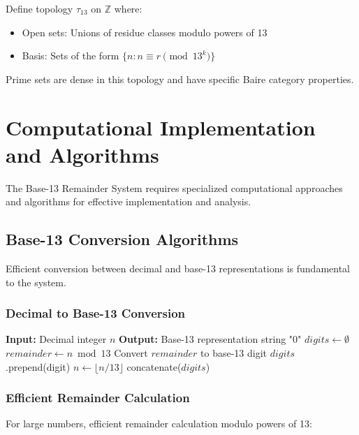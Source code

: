 \documentclass[12pt,a4paper]{report}
\begin{document}
Define topology $\tau_{13}$ on $\mathbb{Z}$ where:
\begin{itemize}
\item Open sets: Unions of residue classes modulo powers of 13
\item Basis: Sets of the form $\{n : n \equiv r \pmod{13^k}\}$
\end{itemize}

Prime sets are dense in this topology and have specific Baire category properties.

\chapter{Computational Implementation and Algorithms}

The Base-13 Remainder System requires specialized computational approaches and algorithms for effective implementation and analysis.

\section{Base-13 Conversion Algorithms}

Efficient conversion between decimal and base-13 representations is fundamental to the system.

\subsection{Decimal to Base-13 Conversion}

\begin{algorithm}[H]
\caption{Decimal to Base-13 Conversion}
\begin{algorithmic}[1]
\STATE \textbf{Input:} Decimal integer $n$
\STATE \textbf{Output:} Base-13 representation string
    \RETURN "0"
\ENDIF
\STATE $digits \leftarrow \emptyset$
    \STATE $remainder \leftarrow n \bmod 13$
    \STATE Convert $remainder$ to base-13 digit
    \STATE $digits$.prepend(digit)
    \STATE $n \leftarrow \lfloor n / 13 \rfloor$
\ENDWHILE
\RETURN concatenate($digits$)
\end{algorithmic}
\end{algorithm}

\subsection{Efficient Remainder Calculation}

For large numbers, efficient remainder calculation modulo powers of 13:
\end{document}
